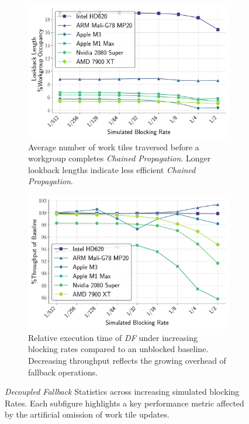 \documentclass[sigconf,screen]{acmart}
\begin{document}
\begin{figure}
  \vspace{0.2em}

  \begin{subfigure}[t]{0.48\linewidth}
    \centering
    \includegraphics[width=\linewidth]{graphics/lookbackLength_plot.pdf}
    \caption{Average number of work tiles traversed before a workgroup completes \emph{Chained Propagation}. Longer lookback lengths indicate less efficient \emph{Chained Propagation}.\label{fig:lookback_length}}
  \end{subfigure}\hfill
  \begin{subfigure}[t]{0.48\linewidth}
    \centering
    \includegraphics[width=\linewidth]{graphics/time_plot.pdf}
    \caption{Relative execution time of \emph{DF} under increasing blocking rates compared to an unblocked baseline. Decreasing throughput reflects the growing overhead of fallback operations.\label{fig:execution_time}}
  \end{subfigure}

  \caption{\emph{Decoupled Fallback} Statistics across increasing simulated blocking Rates. Each subfigure highlights a key performance metric affected by the artificial omission of work tile updates.}
  \label{fig:vertical_images}
\end{figure}
\end{document}
